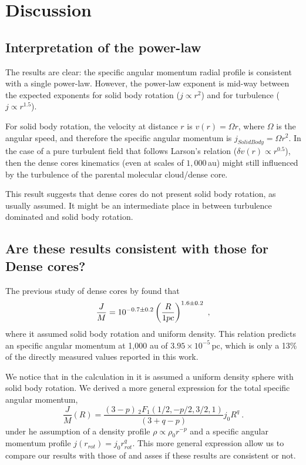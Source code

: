 \section{Discussion}

\subsection{Interpretation of the power-law}
The results are clear: the specific angular momentum radial profile is consistent with a single power-law. 
However, the power-law exponent is mid-way between the expected exponents 
for solid body rotation ($j\propto r^{2}$) and for turbulence ($j\propto r^{1.5}$). 

For solid body rotation, the velocity at distance $r$ is $v(r)=\Omega r$, 
where $\Omega$ is the angular speed, 
and therefore the specific angular momentum is $j_{SolidBody}=\Omega r^2$. 
In the case of a pure turbulent field that follows Larson's relation ($\delta v(r) \propto r^{0.5}$),  
then the dense cores kinematics (even at scales of $1,000$\,au) might still 
influenced by the turbulence of the parental molecular cloud/dense core.

This result suggests that dense cores do not present solid body rotation, as usually assumed. 
It might be an intermediate place in between turbulence dominated and solid body rotation.

\subsection{Are these results consistent with those for Dense cores?}
The previous study of dense cores by \cite{Goodman_1993} found that 
\begin{equation}
\frac{J}{M} = 10^{-0.7\pm0.2} \left(\frac{R}{\textrm 1 pc}\right)^{1.6\pm 0.2}~,
\end{equation}
where it assumed solid body rotation and uniform density. 
This relation predicts an specific angular momentum at 1,000 au of $3.95\times 10^{-5}$\,\kms pc, 
which is only a 13\% of the directly measured values reported in this work.

We notice that in the calculation in \cite{Goodman_1993} it is assumed a uniform density sphere 
with solid body rotation. 
We derived a more general expression for the total specific angular momentum, 
\begin{equation}
\label{eq:J_M}
\frac{J}{M}(R) = \frac{(3-p)\,{}_2F_1(1/2,−p/2,3/2,1)}{(3+q-p)} j_0 R^{q}~.
\end{equation}
under he assumption of a density profile $\rho \propto \rho_0 r^{-p}$ and a specific angular momentum 
profile $j(r_{rot}) = j_0 r_{rot}^q$. 
This more general expression allow us to compare our results with those of \cite{Goodman_1993} and asses 
if these results are consistent or not.

